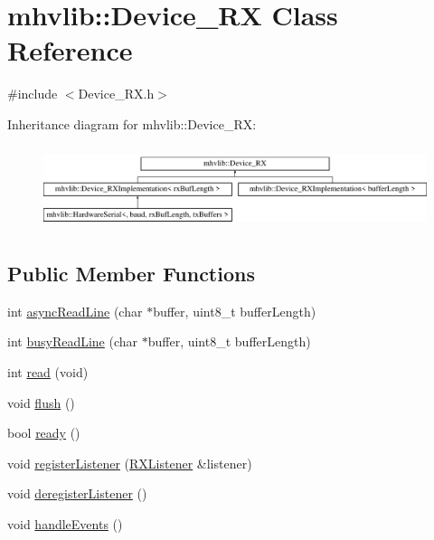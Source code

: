 \hypertarget{classmhvlib_1_1_device___r_x}{\section{mhvlib\-:\-:Device\-\_\-\-R\-X Class Reference}
\label{classmhvlib_1_1_device___r_x}
}


{\ttfamily \#include $<$Device\-\_\-\-R\-X.\-h$>$}

Inheritance diagram for mhvlib\-:\-:Device\-\_\-\-R\-X\-:\begin{figure}[H]
\begin{center}
\leavevmode
\includegraphics[height=2.448980cm]{classmhvlib_1_1_device___r_x}
\end{center}
\end{figure}
\subsection*{Public Member Functions}
\begin{DoxyCompactItemize}
\item 
int \hyperlink{classmhvlib_1_1_device___r_x_ac0eeb94a82aa61a7bf35942cbe0343f6}{async\-Read\-Line} (char $\ast$buffer, uint8\-\_\-t buffer\-Length)
\item 
int \hyperlink{classmhvlib_1_1_device___r_x_a8b5441a6d0e2aa7f434c8b5a623a43f6}{busy\-Read\-Line} (char $\ast$buffer, uint8\-\_\-t buffer\-Length)
\item 
int \hyperlink{classmhvlib_1_1_device___r_x_a026cca1107b0f4d70b9b6474697acf22}{read} (void)
\item 
void \hyperlink{classmhvlib_1_1_device___r_x_ae3511c105b2a644dc6ec7bdd46941d1a}{flush} ()
\item 
bool \hyperlink{classmhvlib_1_1_device___r_x_aa7150438953b3a6d0ad4c623b4689a20}{ready} ()
\item 
void \hyperlink{classmhvlib_1_1_device___r_x_a47cc727d6104667216625d0ccfedc802}{register\-Listener} (\hyperlink{classmhvlib_1_1_r_x_listener}{R\-X\-Listener} \&listener)
\item 
void \hyperlink{classmhvlib_1_1_device___r_x_a94dbaeecc8c224df65200644b87453d7}{deregister\-Listener} ()
\item 
void \hyperlink{classmhvlib_1_1_device___r_x_ad71cb3deb21081feea81029471788144}{handle\-Events} ()
\end{DoxyCompactItemize}
